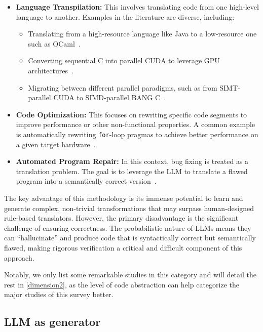 \documentclass[pdflatex,sn-mathphys-ay,twocolumn, a4paper]{sn-jnl}%
\theoremstyle{thmstyleone}%
\theoremstyle{thmstyletwo}%
\theoremstyle{thmstylethree}%
\begin{document}
\begin{itemize}
\item \textbf{Language Transpilation:} This involves translating code from one high-level language to another. Examples in the literature are diverse, including:
\begin{itemize}
\item Translating from a high-resource language like Java to a low-resource one such as OCaml~\citep{106_knowledgetransfer2024_oopsla}.
\item Converting sequential C into parallel CUDA to leverage GPU architectures~\citep{153_babeltower2022_icml, 174_coderosseta2024_neurips}.
\item Migrating between different parallel paradigms, such as from SIMT-parallel CUDA to SIMD-parallel BANG C~\citep{10_qimengxpiler2025_osdi}.
\end{itemize}
\item \textbf{Code Optimization:} This focuses on rewriting specific code segments to improve performance or other non-functional properties. A common example is automatically rewriting \texttt{for}-loop pragmas to achieve better performance on a given target hardware~\citep{47_llmvectorizer2025_cgo}.

\item \textbf{Automated Program Repair:} In this context, bug fixing is treated as a translation problem. The goal is to leverage the LLM to translate a flawed program into a semantically correct version~\citep{131_wei2023_fse,133_xia2023_icse}.
\end{itemize}

The key advantage of this methodology is its immense potential to learn and generate complex, non-trivial transformations that may surpass human-designed rule-based translators. However, the primary disadvantage is the significant challenge of ensuring correctness. The probabilistic nature of LLMs means they can ``hallucinate'' and produce code that is syntactically correct but semantically flawed, making rigorous verification a critical and difficult component of this approach.

Notably, we only list some remarkable studies in this category and will detail the rest in \autoref{dimension2}, as the level of code abstraction can help categorize the major studies of this survey better.

\subsection{LLM as generator}\label{llm_as_generator}
\end{document}
